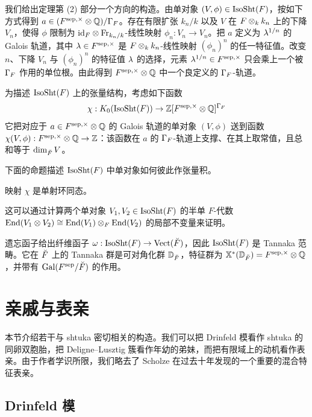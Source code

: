 我们给出定理第 (2) 部分一个方向的构造。由单对象 $(V,\phi)\in \mathrm{IsoSht}(F)$，按如下方式得到 $a\in (F^{\mathrm{sep},\times}\otimes\mathbb{Q})/\Gamma_{F}$。存在有限扩张 $k_{n}/k$ 以及 $V$ 在 $F\otimes_{k}k_{n}$ 上的下降 $V_{n}$，使得 $\phi$ 限制为 $\textup{id}_{F}\otimes \textup{Fr}_{k_{n}/k}$-线性映射 $\phi_{n}: V_{n}\to V_{n}$。把 $a$ 定义为 $\lambda^{1/n}$ 的 Galois 轨道，其中 $\lambda\in F^{\mathrm{sep},\times}$ 是 $F\otimes_{k}k_{n}$-线性映射 $(\phi_{n})^{n}$ 的任一特征值。改变 $n$、下降 $V_{n}$ 与 $(\phi_{n})^{n}$ 的特征值 $\lambda$ 的选择，元素 $\lambda^{1/n}\in F^{\mathrm{sep}, \times}$ 只会乘上一个被 $\Gamma_{F}$ 作用的单位根。由此得到 $F^{\mathrm{sep},\times}\otimes\mathbb{Q}$ 中一个良定义的 $\Gamma_{F}$-轨道。

为描述 $\mathrm{IsoSht}(F)$ 上的张量结构，考虑如下函数
\begin{equation*}
\chi: K_{0}(\mathrm{IsoSht}(F))\to \mathbb{Z}[F^{\mathrm{sep}, \times}\otimes\mathbb{Q}]^{\Gamma_{F}}
\end{equation*}
它把对应于 $a\in F^{\mathrm{sep},\times}\otimes\mathbb{Q}$ 的 Galois 轨道的单对象 $(V,\phi)$ 送到函数 $\chi(V,\phi): F^{\mathrm{sep}, \times}\otimes\mathbb{Q}\to \mathbb{Z}$：该函数在 $a$ 的 $\Gamma_{F}$-轨道上支撑、在其上取常值，且总和等于 $\dim_{\breve F} V$。

下面的命题描述 $\mathrm{IsoSht}(F)$ 中单对象如何彼此作张量积。
\begin{prop}\label{p:IsoSht tensor} 映射 $\chi$ 是单射环同态。
\end{prop}
这可以通过计算两个单对象 $V_{1},V_{2}\in \mathrm{IsoSht}(F)$ 的半单 $F$-代数 $\textup{End}(V_{1}\otimes V_{2})\cong\textup{End}(V_{1})\otimes_{ F}\textup{End}(V_{2})$ 的局部不变量来证明。

遗忘函子给出纤维函子 $\omega: \mathrm{IsoSht}(F)\to \textup{Vect}(\breve F)$，因此 $\mathrm{IsoSht}(F)$ 是 Tannaka 范畴。它在 $\breve F$ 上的 Tannaka 群是可对角化群 $\mathbb{D}_{\breve F}$，特征群为 $\mathbb{X}^*(\mathbb{D}_{\breve F})=F^{\mathrm{sep},\times}\otimes\mathbb{Q}$，并带有 $\textup{Gal}(F^{\mathrm{sep}}/\breve F)$ 的作用。



\section{亲戚与表亲}\label{s:sib}
本节介绍若干与 shtuka 密切相关的构造。我们可以把 Drinfeld 模看作 shtuka 的同卵双胞胎，把 Deligne–Lusztig 簇看作年幼的弟妹，而把有限域上的动机看作表亲。由于作者学识所限，我们略去了 Scholze \cite{S-Berkeley} 在过去十年发现的一个重要的混合特征表亲。

\subsection{Drinfeld 模}

